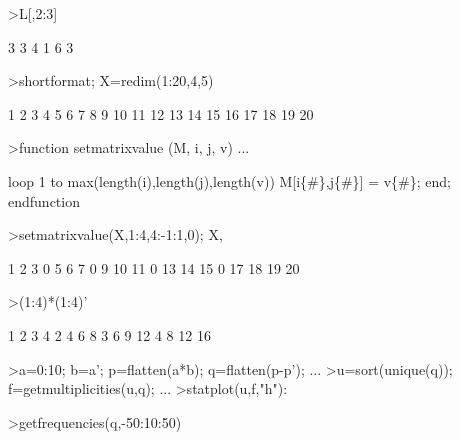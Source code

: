 \documentclass[a4paper,10pt]{article}
\begin{document}
\begin{eulernotebook}
\begin{eulercomment}
\begin{eulercomment}
\begin{eulercomment}
\begin{eulercomment}
\begin{eulercomment}
\begin{eulercomment}
\begin{eulercomment}
\begin{eulercomment}
\begin{eulercomment}
\begin{eulercomment}
\begin{eulercomment}
\end{eulercomment}
\begin{eulerprompt}
>L[,2:3]
\end{eulerprompt}
\begin{euleroutput}
          3         3 
          4         1 
          6         3 
\end{euleroutput}
\begin{eulerprompt}
>shortformat; X=redim(1:20,4,5)
\end{eulerprompt}
\begin{euleroutput}
          1         2         3         4         5 
          6         7         8         9        10 
         11        12        13        14        15 
         16        17        18        19        20 
\end{euleroutput}
\begin{eulerprompt}
>function setmatrixvalue (M, i, j, v) ...
\end{eulerprompt}
\begin{eulerudf}
  loop 1 to max(length(i),length(j),length(v))
     M[i\{#\},j\{#\}] = v\{#\};
  end;
  endfunction
\end{eulerudf}
\begin{eulerprompt}
>setmatrixvalue(X,1:4,4:-1:1,0); X,
\end{eulerprompt}
\begin{euleroutput}
          1         2         3         0         5 
          6         7         0         9        10 
         11         0        13        14        15 
          0        17        18        19        20 
\end{euleroutput}
\begin{eulerprompt}
>(1:4)*(1:4)'
\end{eulerprompt}
\begin{euleroutput}
          1         2         3         4 
          2         4         6         8 
          3         6         9        12 
          4         8        12        16 
\end{euleroutput}
\begin{eulerprompt}
>a=0:10; b=a'; p=flatten(a*b); q=flatten(p-p'); ...
>u=sort(unique(q)); f=getmultiplicities(u,q); ...
>statplot(u,f,"h"):
\end{eulerprompt}
\begin{eulerprompt}
>getfrequencies(q,-50:10:50)
\end{eulerprompt}
\begin{euleroutput}

\end{euleroutput}
\end{eulercomment}
\end{eulercomment}
\end{eulercomment}
\end{eulercomment}
\end{eulercomment}
\end{eulercomment}
\end{eulercomment}
\end{eulercomment}
\end{eulercomment}
\end{eulercomment}
\end{eulernotebook}
\end{document}
